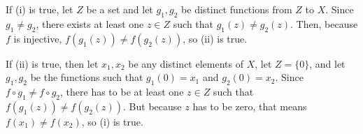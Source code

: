 \documentclass[12pt]{article}
\begin{document}
\section{}
\noindent{}\bigskip\par
If (i) is true, let $Z$ be a set and let $g_1, g_2$ be distinct functions from $Z$ to $X$. Since $g_1 \neq g_2$, there exists at least one $z \in Z$ such that $g_1(z) \neq g_2(z)$. Then, because $f$ is injective, $f(g_1(z)) \neq f(g_2(z))$, so (ii) is true.
\par
If (ii) is true, then let $x_1, x_2$ be any distinct elements of $X$, let $Z = \{0\}$, and let $g_1, g_2$ be the functions such that $g_1(0)=x_1$ and $g_2(0)=x_2$. Since $f \circ g_1 \neq f \circ g_2$, there has to be at least one $z \in Z$ such that $f(g_1(z)) \neq f(g_2(z))$. But because $z$ has to be zero, that means $f(x_1) \neq f(x_2)$, so (i) is true.
\end{document}
